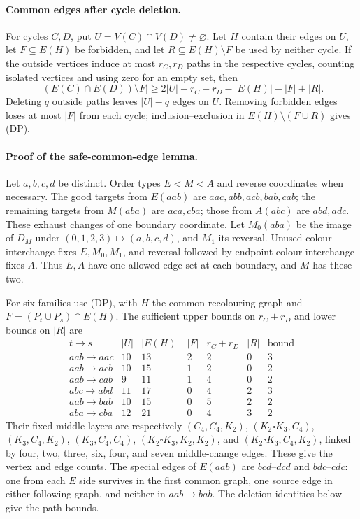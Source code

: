 \paragraph{Common edges after cycle deletion.}
For cycles $C,D$, put $U=V(C)\cap V(D)\ne\varnothing$. Let $H$
contain their edges on $U$, let $F\subseteq E(H)$ be forbidden, and
let $R\subseteq E(H)\setminus F$ be used by neither cycle.
If the outside vertices induce at most $r_C,r_D$ paths in the
respective cycles, counting isolated vertices and using zero for an
empty set, then
\[
 |(E(C)\cap E(D))\setminus F|
 \ge 2|U|-r_C-r_D-|E(H)|-|F|+|R|.                  \tag{DP}
\]
Deleting $q$ outside paths leaves $|U|-q$ edges on $U$. Removing
forbidden edges loses at most $|F|$ from each cycle; inclusion--exclusion
in $E(H)\setminus(F\cup R)$ gives (DP).

\paragraph{Proof of the safe-common-edge lemma.}
Let $a,b,c,d$ be distinct. Order types $E<M<A$ and reverse coordinates
when necessary. The good targets from $E(aab)$ are $aac,abb,acb,bab,cab$;
the remaining targets from $M(aba)$ are $aca,cba$; those from $A(abc)$
are $abd,adc$. These exhaust changes of one boundary coordinate.
Let $M_0(aba)$ be the image of $D_M$ under
$(0,1,2,3)\mapsto(a,b,c,d)$, and $M_1$ its reversal. Unused-colour
interchange fixes $E,M_0,M_1$, and reversal followed by endpoint-colour
interchange fixes $A$. Thus $E,A$ have one allowed edge set at each
boundary, and $M$ has these two.

For six families use (DP), with $H$ the common recolouring graph and
$F=(P_t\cup P_s)\cap E(H)$. The sufficient upper bounds on
$r_C+r_D$ and lower bounds on $|R|$ are
\[
\begin{array}{c|rrrrr|r}
t\to s&|U|&|E(H)|&|F|&r_C+r_D&|R|&\text{bound}\\\hline
aab\to aac&10&13&2&2&0&3\\
aab\to acb&10&15&1&2&0&2\\
aab\to cab&9&11&1&4&0&2\\
abc\to abd&11&17&0&4&2&3\\
aab\to bab&10&15&0&5&2&2\\
aba\to cba&12&21&0&4&3&2
\end{array}                                                     \tag{CT}
\]
Their fixed-middle layers are respectively
$(C_4,C_4,K_2)$, $(K_2\square K_3,C_4)$, $(K_3,C_4,K_2)$,
$(K_3,C_4,C_4)$, $(K_2\square K_3,K_2,K_2)$, and
$(K_2\square K_3,C_4,K_2)$, linked by four, two, three, six, four,
and seven middle-change edges. These give the vertex and edge counts.
The special edges of $E(aab)$ are $bcd$--$dcd$ and $bdc$--$cdc$:
one from each $E$ side survives in the first common graph, one source
edge in either following graph, and neither in $aab\to bab$.
The deletion identities below give the path bounds.

